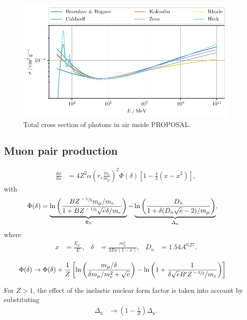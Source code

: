 \begin{figure}
	\centering
    \includegraphics{plots/photoproduction_cross.pdf}
    \caption{Total cross section of photons in air inside PROPOSAL.}
    \label{fig:total_cross_photon}
\end{figure}


\subsection{Muon pair production}

\begin{align}
	\frac{\mathrm{d}\sigma}{\mathrm{d}x} &= 4 Z^2 \alpha \left( r_e \frac{m_e}{m_\mu} \right)^2 \Phi(\delta) \left[ 1 - \frac{4}{3} (x - x^2) \right],
\end{align}
%
with
%
\begin{align}
	\Phi(\delta) &= \underbrace{\ln \left( \frac{B Z^{\sfrac{-1}{3}} m_\mu / m_e}{1 + B Z^{\sfrac{-1}{3}} \sqrt{e} \delta / m_e } \right)}_{\Phi_0} - \underbrace{\ln\left( \frac{D_n}{1 + \delta (D_n \sqrt{e} - 2) / m_\mu} \right)}_{\Delta_\text{n}},
\end{align}
%
where
%
\begin{align}
	x &= \frac{E_{\mu^-}}{E}, & \delta &= \frac{m_\mu^2}{2 E x (1 - x)}, & D_n &= 1.54 A^{0.27}.
\end{align}
%

\begin{align}
	\Phi(\delta) &\rightarrow \Phi(\delta) + \frac{1}{Z} \left[ \ln\left( \frac{m_\mu / \delta}{\delta m_\mu / m_e^2 + \sqrt{e}} \right) - \ln\left( 1 + \frac{1}{\delta \sqrt{e} B^\prime Z^{\sfrac{-2}{3}} / m_e} \right) \right]
\end{align}

For $Z > 1$, the effect of the inelastic nuclear form factor is taken into account by substituting
%
\begin{align}
	\Delta_\text{n} &\rightarrow \left( 1 - \frac{1}{Z} \right) \Delta_\text{n}.
\end{align}

